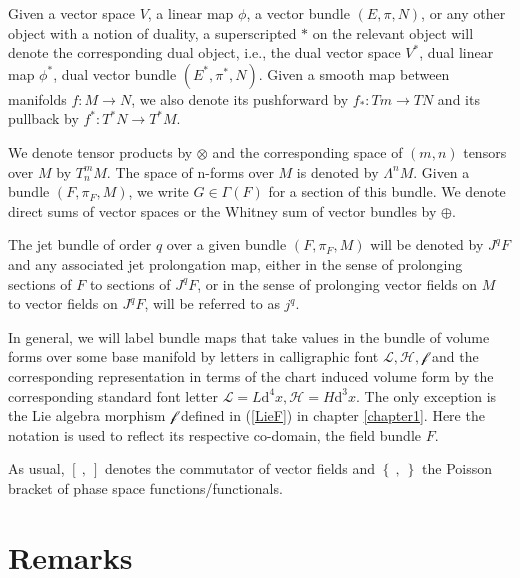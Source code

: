 Given a vector space $V$, a linear map $\phi$, a vector bundle $(E,\pi,N)$, or any other object with a notion of duality, a superscripted $\ast$ on the relevant object will denote the corresponding dual object, i.e., the dual vector space $V^{\ast}$, dual linear map $\phi^{\ast}$, dual vector bundle $(E^{\ast}, \pi^{\ast},N)$. Given a smooth map between manifolds $f : M \rightarrow N$, we also denote its pushforward by $f_{\ast} : Tm \rightarrow TN$ and its pullback by $f^{\ast} : T^{\ast}N \rightarrow T^{\ast}M$.

We denote tensor products by $\otimes$ and the corresponding space of $(m,n)$ tensors over $M$ by $T^m_nM$. The space of n-forms over $M$ is denoted by $\Lambda^nM$. Given a bundle $(F,\pi_{F},M)$, we write $G \in \Gamma(F) $ for a section of this bundle. We denote direct sums of vector spaces or the Whitney sum of vector bundles by $\oplus$. 

The jet bundle of order $q$ over a given bundle $(F,\pi_F,M)$ will be denoted by $J^qF$ and any associated jet prolongation map, either in the sense of prolonging sections of $F$ to sections of $J^qF$, or in the sense of prolonging vector fields on $M$ to vector fields on $J^qF$, will be referred to as $j^q$. 

In general, we will label bundle maps that take values in the bundle of volume forms over some base manifold by letters in calligraphic font $\mathcal{L}, \mathcal{H}, \mathcal{f}$ and the corresponding representation in terms of the chart induced volume form by the corresponding standard font letter $\mathcal{L}=L \mathrm{d}^4x, \mathcal{H}= H \mathrm{d}^3x$. The only exception is the Lie algebra morphism $\mathcal{f}$ defined in (\ref{LieF}) in chapter \ref{chapter1}. Here the notation is used to reflect its respective co-domain, the field bundle $F$. 

As usual, $\left[ \  ,   \  \right]$ denotes the commutator of vector fields and $\left \{  \  ,   \   \right \}$ the Poisson bracket of phase space functions/functionals. \\

\newpage

\section*{Remarks}

